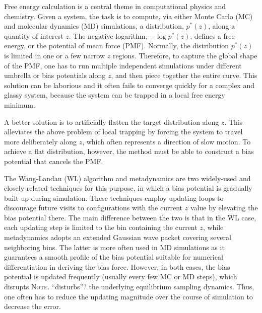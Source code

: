 \documentclass[reprint, floatfix]{revtex4-1}
\newcommand{\note}[1]{{\color{DarkGreen}\footnotesize \textsc{Note.} #1}}
\begin{document}
Free energy calculation\cite{frenkel, newman} is a central theme
in computational physics and chemistry.
%
Given a system,
the task is to compute,
via either Monte Carlo\cite{frenkel, newman, landau_binder} (MC)
and molecular dynamics\cite{frenkel, karplus2002} (MD) simulations,
a distribution, $p^*(z)$,
along a quantity of interest $z$.
%
The negative logarithm,
$-\log p^*(z)$,
defines a free energy,
or the potential of mean force (PMF).
%
Normally, the distribution $p^*(z)$ is
limited in one or a few narrow $z$ regions.
%
Therefore, to capture the global shape
of the PMF,
one has to run multiple independent simulations
under different umbrella or bias potentials
along $z$\cite{mezei1987, berg1992, lee1993},
and then piece together the entire curve.
%
This solution can be laborious %
and it often fails to converge quickly
for a complex and glassy system,
because the system can be trapped
in a local free energy minimum.



A better solution is to artificially flatten
the target distribution along $z$\cite{mezei1987, berg1992, lee1993,
wang2001, wang2001pre, laio2002, laio2008, barducci2011, sutto2012}.
%
This alleviates the above problem of local trapping
by forcing the system to travel more
deliberately along $z$,
which often represents
a direction of slow motion.
%
To achieve a flat distribution, however,
the method must be able to construct a
bias potential that cancels the PMF.



The Wang-Landau (WL) algorithm\cite{wang2001, wang2001pre}
and meta\-dy\-nam\-ics\cite{huber1994, laio2002,
laio2008, barducci2011, sutto2012}
are two widely-used and closely-related\cite{micheletti2004}
techniques for this purpose,
in which a bias potential is gradually built up
during simulation.
%
These techniques employ updating loops
to discourage future visits to configurations
with the current $z$ value
by elevating the bias potential there.
%
The main difference between the two
is that in the WL case,
each updating step is limited to the bin
containing the current $z$,
while metadynamics adopts an extended
Gaussian wave packet
covering several neighboring bins.
%
The latter is more often used in MD simulations
as it guarantees a smooth profile
of the bias potential
suitable for numerical differentiation
in deriving the bias force.
%
However, in both cases, the bias potential
is updated frequently (usually every few MC or MD steps),
which %
disrupts \note{``disturbs''?} the underlying
equilibrium sampling dynamics\cite{laio2002}.
%
Thus, one often has to reduce
the updating magnitude
over the course of simulation
to decrease the error.
\end{document}
